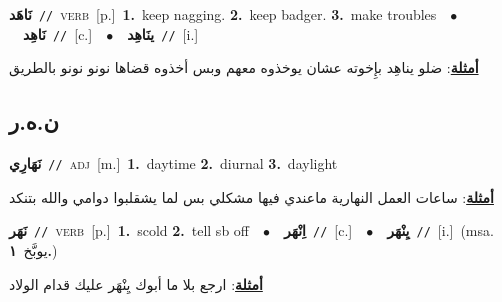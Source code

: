 \documentclass[10pt,a4paper,twoside]{article} %
\begin{document}
\begin{multicols}{2}
{\setlength\topsep{0pt}\textbf{\foreignlanguage{arabic}{نَاهَد}}\ {\color{gray}\texttt{//}\color{black}}\ \textsc{verb}\ [p.]\ \textbf{1.}~keep nagging.  \textbf{2.}~keep badger.  \textbf{3.}~make troubles\ \ $\bullet$\ \ \setlength\topsep{0pt}\textbf{\foreignlanguage{arabic}{نَاهِد}}\ {\color{gray}\texttt{//}\color{black}}\ [c.]\ \ $\bullet$\ \ \setlength\topsep{0pt}\textbf{\foreignlanguage{arabic}{ينَاهِد}}\ {\color{gray}\texttt{//}\color{black}}\ [i.]\  \begin{flushright}\color{gray}\foreignlanguage{arabic}{\textbf{\underline{\foreignlanguage{arabic}{أمثلة}}}: ضلو يناهِد بإِخوته عشان يوخذوه معهم وبس أخذوه قضاها نونو نونو بالطريق}\end{flushright}\color{black}} \vspace{2mm}

\vspace{-3mm}
\subsection*{\color{blue}\foreignlanguage{arabic}{ن.ه.ر}\color{blue}{}} 

{\setlength\topsep{0pt}\textbf{\foreignlanguage{arabic}{نَهَارِي}}\ {\color{gray}\texttt{//}\color{black}}\ \textsc{adj}\ [m.]\ \textbf{1.}~daytime  \textbf{2.}~diurnal  \textbf{3.}~daylight\  \begin{flushright}\color{gray}\foreignlanguage{arabic}{\textbf{\underline{\foreignlanguage{arabic}{أمثلة}}}: ساعات العمل النهارية ماعندي فيها مشكلي بس لما يشقلبوا دوامي والله بتنكد}\end{flushright}\color{black}} \vspace{2mm}

{\setlength\topsep{0pt}\textbf{\foreignlanguage{arabic}{نَهَر}}\ {\color{gray}\texttt{//}\color{black}}\ \textsc{verb}\ [p.]\ \textbf{1.}~scold  \textbf{2.}~tell sb off\ \ $\bullet$\ \ \setlength\topsep{0pt}\textbf{\foreignlanguage{arabic}{اِنْهَر}}\ {\color{gray}\texttt{//}\color{black}}\ [c.]\ \ $\bullet$\ \ \setlength\topsep{0pt}\textbf{\foreignlanguage{arabic}{يِنْهَر}}\ {\color{gray}\texttt{//}\color{black}}\ [i.]\ \color{gray}(msa. \foreignlanguage{arabic}{يوبَّخ}~\foreignlanguage{arabic}{\textbf{١.}})\color{black}\  \begin{flushright}\color{gray}\foreignlanguage{arabic}{\textbf{\underline{\foreignlanguage{arabic}{أمثلة}}}: ارجع بلا ما أبوك يِنْهَر عليك قدام الولاد}\end{flushright}\color{black}} \vspace{2mm}


\end{multicols}
\end{document}
